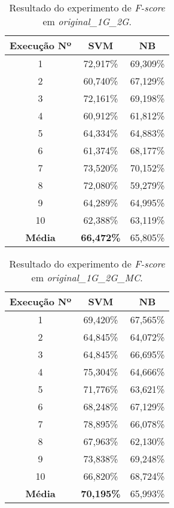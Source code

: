 \begin{table}[h]
    \centering
    \begin{tabular}{c c c}
        \hline
        {\bf Execução Nº} & {\bf SVM} & {\bf NB} \\
        \hline
        1 & 72,917\% & 69,309\% \\
        2 & 60,740\% & 67,129\% \\
        3 & 72,161\% & 69,198\% \\
        4 & 60,912\% & 61,812\% \\
        5 & 64,334\% & 64,883\% \\
        6 & 61,374\% & 68,177\% \\
        7 & 73,520\% & 70,152\% \\
        8 & 72,080\% & 59,279\% \\
        9 & 64,289\% & 64,995\% \\
        10 & 62,388\% & 63,119\% \\
        \hline
        {\bf Média} & {\bf 66,472\%} & 65,805\% \\
        \hline
    \end{tabular}
    \caption{Resultado do experimento de {\it F-score} em {\it original\_1G\_2G}.}
    \label{tab:resultados-li-ori-1g-2g}
\end{table}

\begin{table}[h]
    \centering
    \begin{tabular}{c c c}
        \hline
        {\bf Execução Nº} & {\bf SVM} & {\bf NB} \\
        \hline
        1 & 69,420\% & 67,565\% \\
        2 & 64,845\% & 64,072\% \\
        3 & 64,845\% & 66,695\% \\
        4 & 75,304\% & 64,666\% \\
        5 & 71,776\% & 63,621\% \\
        6 & 68,248\% & 67,129\% \\
        7 & 78,895\% & 66,078\% \\
        8 & 67,963\% & 62,130\% \\
        9 & 73,838\% & 69,248\% \\
        10 & 66,820\% & 68,724\% \\
        \hline
        {\bf Média} & {\bf 70,195\%} & 65,993\% \\
        \hline
    \end{tabular}
    \caption{Resultado do experimento de {\it F-score} em {\it original\_1G\_2G\_MC}.}
    \label{tab:resultados-li-ori-1g-2g-mc}
\end{table}

